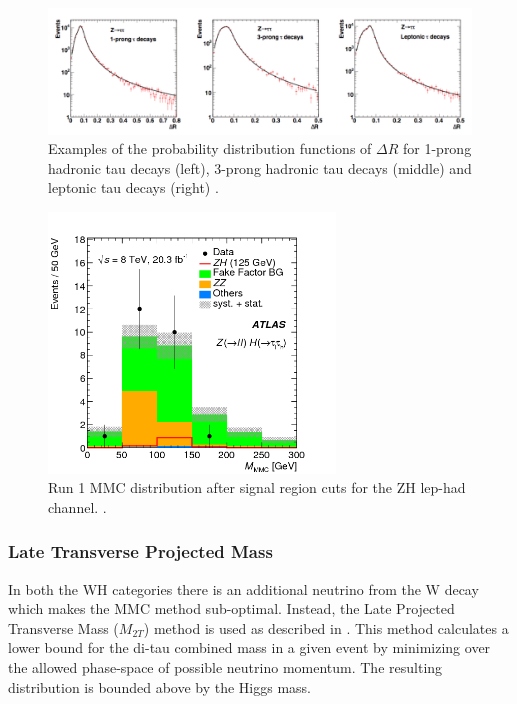 \begin{figure}[htb!]
    \centering
    \includegraphics[width=5.5in]{figures/chapter6/mmc_probs.png}
    \caption{Examples of the probability distribution functions of $\Delta R$ for 1-prong hadronic tau decays (left), 3-prong hadronic tau decays (middle) and leptonic tau decays (right) \cite{mmc}.}
    \label{fig:mmc_probs}
\end{figure}

\begin{figure}[htb!]
    \centering
    \includegraphics[width=3in]{figures/chapter6/mmc_run1.png}
    \caption{Run 1 MMC distribution after signal region cuts for the ZH lep-had channel. \cite{vh_run1_paper}.}
    \label{fig:mmc_run1}
\end{figure}

\subsubsection{Late Transverse Projected Mass}
In both the WH categories there is an additional neutrino from the W decay which makes the MMC method sub-optimal. Instead, the Late Projected Transverse Mass ($M_{2T}$) method is used as described in \cite{m2t}. This method calculates a lower bound for the di-tau combined mass in a given event by minimizing over the allowed phase-space of possible neutrino momentum. The resulting distribution is bounded above by the Higgs mass.\\

